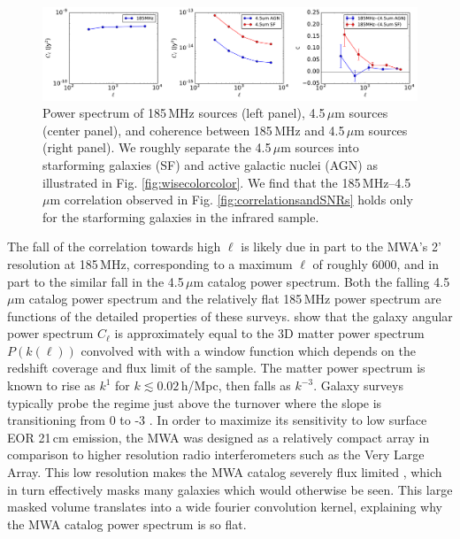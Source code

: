 \documentclass{emulateapj}
\begin{document}
\begin{figure}[h]
\centering
\includegraphics[width=7in]{images/mwa_wise_qsoagn_gal_xspec.pdf}
\caption{Power spectrum of 185\,MHz sources (left panel), 4.5\,$\mu$m sources (center panel), and coherence between 185\,MHz and 4.5\,$\mu$m sources (right panel). We roughly separate the 4.5\,$\mu$m sources into starforming galaxies (SF) and active galactic nuclei (AGN) as illustrated in Fig.  \ref{fig:wisecolorcolor}. We find that the 185\,MHz--4.5\,$\mu$m correlation observed in Fig. \ref{fig:correlationsandSNRs} holds only for the starforming galaxies in the infrared sample. }
\label{fig:wisexspec}
\end{figure}

The fall of the correlation towards high $\ell$ is likely due in part to the MWA's 2' resolution at 185\,MHz, corresponding to a maximum $\ell$ of roughly 6000, and in part to the similar fall in the 4.5\,$\mu$m catalog power spectrum. Both the falling 4.5\,$\mu$m catalog power spectrum and the relatively flat 185\,MHz power spectrum are functions of the detailed properties of these surveys. \citet{tegmark02,dodelson02} show that the galaxy angular power spectrum $C_\ell$ is approximately equal to the 3D matter power spectrum $P(k(\ell))$ convolved with with a window function which depends on the redshift coverage and flux limit of the sample. The matter power spectrum is known to rise as $k^{1}$ for $k\lesssim0.02$\,h/Mpc, then falls as $k^{-3}$. Galaxy surveys typically probe the regime just above the turnover where the slope is transitioning from 0 to -3 \citep{tegmark02b}. In order to maximize its sensitivity to low surface EOR 21\,cm emission, the MWA was designed as a relatively compact array in comparison to higher resolution radio interferometers such as the Very Large Array. This low resolution makes the MWA catalog severely flux limited \citep{PattiCatalog1}, which in turn effectively masks many galaxies which would otherwise be seen. This large masked volume translates into a wide fourier convolution kernel, explaining why the MWA catalog power spectrum is so flat. 
\end{document}
